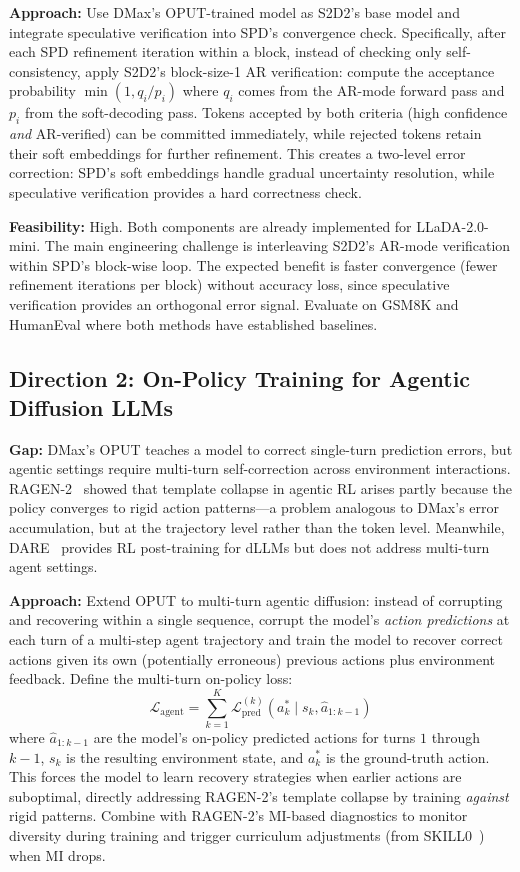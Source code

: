 \documentclass[11pt]{article}
\begin{document}
\textbf{Approach:} Use DMax's OPUT-trained model as S2D2's base model and integrate speculative verification into SPD's convergence check. Specifically, after each SPD refinement iteration within a block, instead of checking only self-consistency, apply S2D2's block-size-1 AR verification: compute the acceptance probability $\min(1, q_i / p_i)$ where $q_i$ comes from the AR-mode forward pass and $p_i$ from the soft-decoding pass. Tokens accepted by both criteria (high confidence \textit{and} AR-verified) can be committed immediately, while rejected tokens retain their soft embeddings for further refinement. This creates a two-level error correction: SPD's soft embeddings handle gradual uncertainty resolution, while speculative verification provides a hard correctness check.

\textbf{Feasibility:} High. Both components are already implemented for LLaDA-2.0-mini. The main engineering challenge is interleaving S2D2's AR-mode verification within SPD's block-wise loop. The expected benefit is faster convergence (fewer refinement iterations per block) without accuracy loss, since speculative verification provides an orthogonal error signal. Evaluate on GSM8K and HumanEval where both methods have established baselines.

\subsection{Direction 2: On-Policy Training for Agentic Diffusion LLMs}

\textbf{Gap:} DMax's OPUT teaches a model to correct single-turn prediction errors, but agentic settings require multi-turn self-correction across environment interactions. RAGEN-2~\cite{ragen2} showed that template collapse in agentic RL arises partly because the policy converges to rigid action patterns---a problem analogous to DMax's error accumulation, but at the trajectory level rather than the token level. Meanwhile, DARE~\cite{dare} provides RL post-training for dLLMs but does not address multi-turn agent settings.

\textbf{Approach:} Extend OPUT to multi-turn agentic diffusion: instead of corrupting and recovering within a single sequence, corrupt the model's \textit{action predictions} at each turn of a multi-step agent trajectory and train the model to recover correct actions given its own (potentially erroneous) previous actions plus environment feedback. Define the multi-turn on-policy loss:
\begin{equation}
    \mathcal{L}_{\mathrm{agent}} = \sum_{k=1}^{K} \mathcal{L}_{\mathrm{pred}}^{(k)}(a_{k}^{*} \mid s_k, \hat{a}_{1:k-1})
\end{equation}
where $\hat{a}_{1:k-1}$ are the model's on-policy predicted actions for turns $1$ through $k-1$, $s_k$ is the resulting environment state, and $a_{k}^{*}$ is the ground-truth action. This forces the model to learn recovery strategies when earlier actions are suboptimal, directly addressing RAGEN-2's template collapse by training \textit{against} rigid patterns. Combine with RAGEN-2's MI-based diagnostics to monitor diversity during training and trigger curriculum adjustments (from SKILL0~\cite{skill0}) when MI drops.
\end{document}
